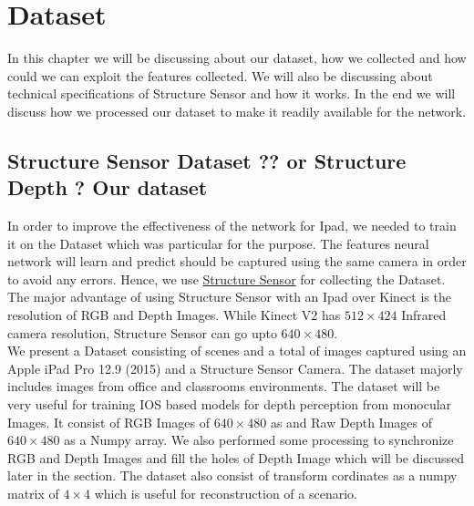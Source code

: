 

\chapter{Dataset}

\label{Chapter4:Dataset} 


In this chapter we will be discussing about our dataset, how we collected and how could we can exploit the features collected. We will also be discussing about technical specifications of Structure Sensor and how it works. In the end we will discuss how we processed our dataset to make it readily available for the network.


\section{Structure Sensor Dataset ?? or Structure Depth ? Our dataset} 

In order to improve the effectiveness of the network for Ipad, we needed to train it on the Dataset which was particular for the purpose. The features neural network will learn and predict should be captured using the same camera in order to avoid any errors. Hence, we use \href{https://structure.io/}{Structure Sensor} for collecting the Dataset. The major advantage of using Structure Sensor with an Ipad over Kinect is the resolution of RGB and Depth Images. While Kinect V2 has $512\times424$ Infrared camera resolution, Structure Sensor can go upto $640\times480$. \\

We present a Dataset consisting of  scenes and a total of  images captured using an Apple iPad Pro 12.9 (2015) and a Structure Sensor Camera. The dataset majorly includes images from office and classrooms environments. The dataset will be very useful for training IOS based models for depth perception from monocular Images. It consist of RGB Images of $640\times480$ as  and Raw Depth Images of $640\times480$ as a Numpy array. We also performed some processing to synchronize RGB and Depth Images and fill the holes of Depth Image which will be discussed later in the section. The dataset also consist of transform cordinates as a numpy matrix of $4\times4$ which is useful for reconstruction of a scenario.\\


